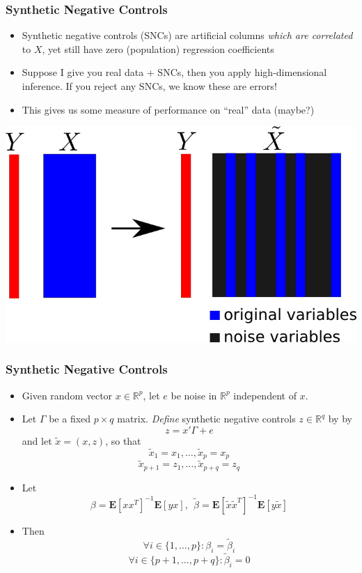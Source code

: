 \documentclass{beamer}
\newcommand{\E}{\textbf{E}}
\begin{document}
\begin{frame}
\frametitle{Synthetic Negative Controls}
\begin{itemize}
\item Synthetic negative controls (SNCs) are artificial columns \emph{which are correlated} to $X$,
yet still have zero (population) regression coefficients
\item Suppose I give you real data + SNCs, then you apply high-dimensional inference.
If you reject any SNCs, we know these are errors!
\item This gives us some measure of performance on ``real'' data (maybe?)
\end{itemize}
\begin{center}
\includegraphics[scale = 0.35]{anc.png}
\end{center}
\end{frame}


\begin{frame}
\frametitle{Synthetic Negative Controls}
\begin{itemize}
\item<1-> Given random vector $x \in \mathbb{R}^p$, let $e$ be noise in $\mathbb{R}^p$ independent of $x$.
\item<1-> Let $\Gamma$ be a fixed $p \times q$ matrix. \emph{Define} synthetic negative controls $z \in \mathbb{R}^{q}$ by
by
\[
z = x'\Gamma + e
\]
and let $\tilde{x} = (x, z)$, so that 
\[
\tilde{x}_1 = x_1,\hdots, \tilde{x}_p = x_p
\]
\[
\tilde{x}_{p+1} = z_1,\hdots, \tilde{x}_{p+q} = z_q
\]
\item<2-> Let
\[
\beta = \E[xx^T]^{-1}\E[yx], \ \ \tilde{\beta} = \E[\tilde{x}\tilde{x}^T]^{-1} \E[y\tilde{x}]
\]
\item<3-> Then
\[
\forall i \in \{1, \hdots, p\}: \beta_i = \tilde{\beta}_i
\]
\[
\forall i \in \{p+1,\hdots, p+q\}: \tilde{\beta}_i = 0
\]
\end{itemize}
\end{frame}
\end{document}
